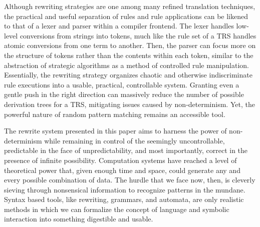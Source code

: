 \documentclass{article}
\begin{document}
Although rewriting strategies are one among many refined translation techniques,
the practical and useful separation of rules and rule applications can be likened to that of a lexer and parser within a compiler frontend.
The lexer handles low-level conversions from strings into tokens, much like the rule set of a TRS handles atomic conversions from one term to another.
Then, the parser can focus more on the structure of tokens rather than the contents within each token, similar to the
abstraction of strategic algorithms as a method of controlled rule manipulation.
Essentially, the rewriting strategy organizes chaotic and otherwise indiscriminate rule executions into a usable, practical, controllable system.
Granting even a gentle push in the right direction can massively reduce the number of possible derivation trees for a TRS,
mitigating issues caused by non-determinism. Yet, the powerful nature of random pattern matching remains an accessible tool.

The rewrite system presented in this paper aims
to harness the power of non-determinism while remaining in control of the seemingly uncontrollable,
predictable in the face of unpredictability, and most importantly, correct in the presence of infinite possibility.
Computation systems have reached a level of theoretical power that, given enough time and space, could generate any and every possible
combination of data. The hurdle that we face now, then, is cleverly sieving through nonsensical information to recognize patterns in the mundane.
Syntax based tools, like rewriting, grammars, and automata, are only realistic methods in which we can formalize the concept of language and symbolic interaction
into something digestible and usable.



\pagebreak
\nocite{*} %
\printbibliography %
\end{document}
